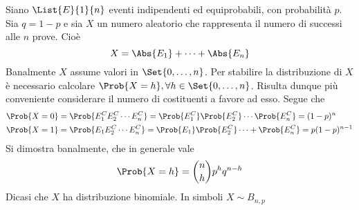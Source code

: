 \documentclass{subfiles}
\begin{document}
Siano $\List{E}{1}{n}$ eventi indipendenti ed equiprobabili, con probabilità $p$.
Sia $q = 1 - p$ e sia $X$ un numero aleatorio che rappresenta il numero di successi alle $n$ prove.
Cioè
$$
    X = \Abs{E_{1}} + \cdots + \Abs{E_{n}}
$$
Banalmente $X$ assume valori in $\Set{0, \ldots, n}$.
Per stabilire la distribuzione di $X$ è necessario calcolare $\Prob{X = h}, \forall h \in \Set{0, \ldots, n}$.
Risulta dunque più conveniente considerare il numero di costituenti a favore ad esso.
Segue che
$$\begin{aligned}
        \Prob{X = 0} & = \Prob{E_{1}^{C}E_{2}^{C}\cdots E_{n}^{C}} = \Prob{E^{C}_{1}} \Prob{E^{C}_{2}} \cdots  \Prob{E^{C}_{n}} = (1 - p)^{n} \\
        \Prob{X = 1} & = \Prob{E_{1}E_{2}^{C}\cdots E_{n}^{C}} = \Prob{E_{1}} \Prob{E^{C}_{2}} \cdots + \Prob{E^{C}_{n}} = p(1 - p)^{n - 1}   \\
    \end{aligned}$$
Si dimostra banalmente, che in generale vale
$$
    \Prob{X = h} = \binom{n}{h}p^{h}q^{n - h}
$$
Dicasi che $X$ ha distribuzione binomiale. In simboli $X \sim B_{n,p}$
\end{document}
